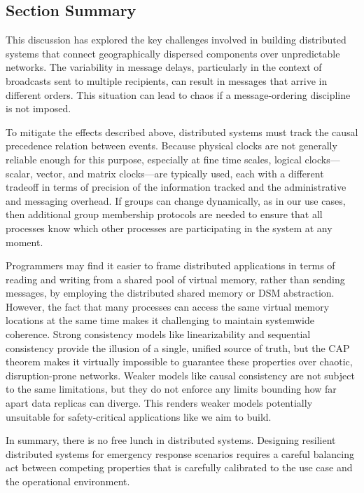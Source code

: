 \documentclass[]             %
{NASA}                       %
\theoremstyle{definition}
\begin{document}
\subsection{Section Summary}
\label{ssec:background-summary}
This discussion has explored the key challenges involved in building
distributed systems that connect geographically dispersed components
over unpredictable networks. The variability in message delays,
particularly in the context of broadcasts sent to multiple recipients,
can result in messages that arrive in different orders.  This
situation can lead to chaos if a message-ordering discipline is not
imposed.

To mitigate the effects described above, distributed systems must
track the causal precedence relation between events. Because physical
clocks are not generally reliable enough for this purpose, especially
at fine time scales, logical clocks---scalar, vector, and matrix
clocks---are typically used, each with a different tradeoff in terms
of precision of the information tracked and the administrative and
messaging overhead. If groups can change dynamically, as in our use
cases, then additional group membership protocols are needed to ensure
that all processes know which other processes are participating in the
system at any moment.

Programmers may find it easier to frame distributed applications in
terms of reading and writing from a shared pool of virtual memory,
rather than sending messages, by employing the distributed shared
memory or DSM abstraction. However, the fact that many processes can
access the same virtual memory locations at the same time makes it
challenging to maintain systemwide coherence. Strong consistency
models like linearizability and sequential consistency provide the
illusion of a single, unified source of truth, but the CAP theorem
makes it virtually impossible to guarantee these properties over
chaotic, disruption-prone networks. Weaker models like causal
consistency are not subject to the same limitations, but they do not
enforce any limits bounding how far apart data replicas can
diverge. This renders weaker models potentially unsuitable for
safety-critical applications like we aim to build.

In summary, there is no free lunch in distributed systems. Designing
resilient distributed systems for emergency response scenarios
requires a careful balancing act between competing properties that is
carefully calibrated to the use case and the operational environment.
\end{document}
